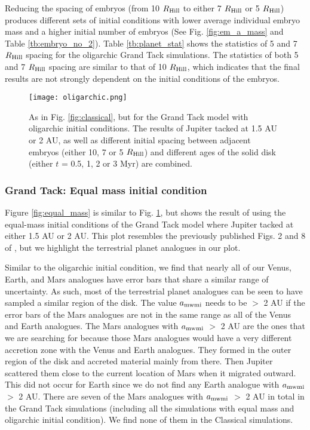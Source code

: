 \documentclass{aa}
\begin{document}
Reducing the spacing of embryos (from 10 $R_{\rm Hill}$ to either 7 $R_{\rm Hill}$ or 5 $R_{\rm Hill}$) produces different sets of initial conditions with lower average individual embryo mass and a higher initial number of embryos (See Fig. \ref{fig:em_a_mass} and Table \ref{tb:embryo_no_2}). Table \ref{tb:planet_stat} shows the statistics of 5 and 7 $R_{\rm Hill}$ spacing for the oligarchic Grand Tack simulations. The statistics of both 5 and 7 $R_{\rm Hill}$ spacing are similar to that of 10 $R_{\rm Hill}$, which indicates that the final results are not strongly dependent on the initial conditions of the embryos.

\begin{figure*}
\sidecaption
\texttt{[image: oligarchic.png]}
\caption{As in Fig. \ref{fig:classical}, but for the Grand Tack model with oligarchic initial conditions. The results of Jupiter tacked at 1.5 AU or 2 AU, as well as different initial spacing between adjacent embryos (either 10, 7 or 5 $R_{\rm Hill}$) and different ages of the solid disk (either $t$ = 0.5, 1, 2 or 3 Myr) are combined.}
\label{fig:grand_oli}

\end{figure*}

\subsubsection{Grand Tack: Equal mass initial condition}
\label{subsubsec:grand_equal}
Figure \ref{fig:equal_mass} is similar to Fig. \ref{fig:grand_oli}, but shows the result of using the equal-mass initial conditions of the Grand Tack model where Jupiter tacked at either 1.5 AU or 2 AU. This plot resembles the previously published Figs. 2 and 8 of \cite{brasser2017cool}, but we highlight the terrestrial planet analogues in our plot.

Similar to the oligarchic initial condition, we find that nearly all of our Venus, Earth, and Mars analogues have error bars that share a similar range of uncertainty. As such, most of the terrestrial planet analogues can be seen to have sampled a similar region of the disk. The value $a_{\rm mwmi}$ needs to be $>$ 2 AU if the error bars of the Mars analogues are not in the same range as all of the Venus and Earth analogues. The Mars analogues with $a_{\rm mwmi}$ $>$ 2 AU are the ones that we are searching for because those Mars analogues would have a very different accretion zone with the Venus and Earth analogues. They formed in the outer region of the disk and accreted material mainly from there. Then Jupiter scattered them close to the current location of Mars when it migrated outward. This did not occur for Earth since we do not find any Earth analogue with $a_{\rm mwmi}$ $>$ 2 AU. There are seven of the Mars analogues with $a_{\rm mwmi}$ $>$ 2 AU in total in the Grand Tack simulations (including all the simulations with equal mass and oligarchic initial condition). We find none of them in the Classical simulations.
\end{document}
